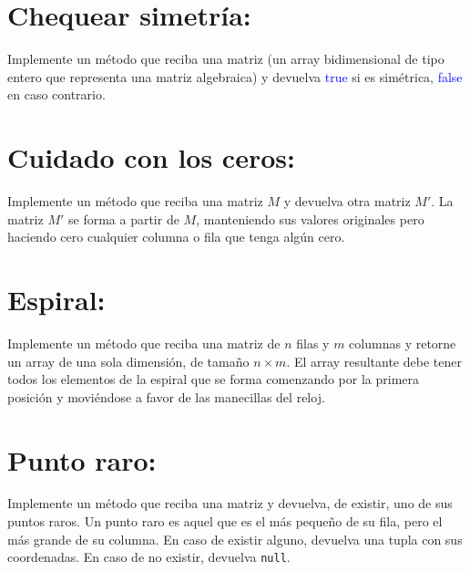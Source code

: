 \section{Chequear simetría:}  
Implemente un método que reciba una matriz (un array bidimensional de tipo entero que representa una matriz algebraica) y devuelva \textcolor{blue}{true} si es simétrica, \textcolor{blue}{false} en caso contrario.

\section{Cuidado con los ceros:}  
Implemente un método que reciba una matriz \(M\) y devuelva otra matriz \(M'\). La matriz \(M'\) se forma a partir de \(M\), manteniendo sus valores originales pero haciendo cero cualquier columna o fila que tenga algún cero.

\section{Espiral:}  
Implemente un método que reciba una matriz de \(n\) filas y \(m\) columnas y retorne un array de una sola dimensión, de tamaño \(n \times m\). El array resultante debe tener todos los elementos de la espiral que se forma comenzando por la primera posición y moviéndose a favor de las manecillas del reloj.

\section{Punto raro:}  
Implemente un método que reciba una matriz y devuelva, de existir, uno de sus puntos raros. Un punto raro es aquel que es el más pequeño de su fila, pero el más grande de su columna. En caso de existir alguno, devuelva una tupla con sus coordenadas. En caso de no existir, devuelva \texttt{null}.